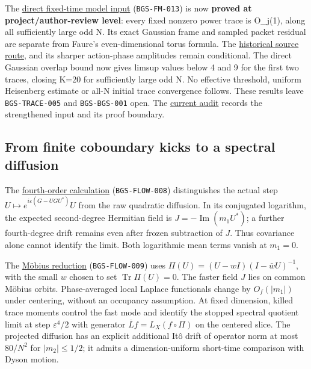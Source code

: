 The \href{https://github.com/ChurilovMaksim/BGS/blob/main/mathematics/fixed_time_wavepacket_trace_bound.md}{direct fixed-time model input}
(\texttt{BGS-FM-013}) is now \textbf{proved at project/author-review level}: every fixed
nonzero power trace is O\_j(1), along all sufficiently large odd N.
Its exact Gaussian frame and sampled packet residual are separate from
Faure's even-dimensional torus formula. The \href{https://github.com/ChurilovMaksim/BGS/blob/main/mathematics/quadratic_noise_fixed_time_input.md}{historical source route},
and its sharper action-phase amplitudes remain conditional. The direct
Gaussian overlap bound now gives limsup values below 4 and 9 for the first
two traces, closing K=20 for sufficiently large odd N.
No effective threshold, uniform Heisenberg estimate or all-N initial trace
convergence follows. These results leave \texttt{BGS-TRACE-005} and \texttt{BGS-BGS-001}
open. The \href{https://github.com/ChurilovMaksim/BGS/blob/main/archive/record/expansion_wavepacket_review_20261004.md}{current audit}
records the strengthened input and its proof boundary.

\hypertarget{from-finite-coboundary-kicks-to-a-spectral-diffusion}{%
\subsection{From finite coboundary kicks to a spectral diffusion}\label{from-finite-coboundary-kicks-to-a-spectral-diffusion}}

The \href{https://github.com/ChurilovMaksim/BGS/blob/main/mathematics/coboundary_fourth_order_drift.md}{fourth-order calculation}
(\texttt{BGS-FLOW-008}) distinguishes the actual step
\(U\mapsto e^{i\varepsilon(G-UGU^*)}U\) from the raw quadratic diffusion.
In its conjugated logarithm, the expected second-degree Hermitian field
is \(J=-\operatorname{Im}(m_1U^*)\); a further fourth-degree drift remains
even after frozen subtraction of \(J\). Thus covariance alone cannot
identify the limit. Both logarithmic mean terms vanish at \(m_1=0\).

The \href{https://github.com/ChurilovMaksim/BGS/blob/main/mathematics/coboundary_mobius_diffusion.md}{Möbius reduction}
(\texttt{BGS-FLOW-009}) uses
\(\Pi(U)=(U-wI)(I-\bar wU)^{-1}\), with the small \(w\) chosen to set
\(\operatorname{Tr}\Pi(U)=0\). The faster field \(J\) lies on common
Möbius orbits. Phase-averaged local Laplace functionals change by
\(O_f(|m_1|)\) under centering, without an occupancy assumption.
At fixed dimension, killed trace moments control the fast mode and
identify the stopped spectral quotient limit at step \(\varepsilon^4/2\)
with generator \(\overline Lf=L_X(f\circ\Pi)\) on the centered slice.
The projected diffusion has an explicit additional Itô drift of operator
norm at most \(80/N^2\) for \(|m_2|\le1/2\); it admits a dimension-uniform
short-time comparison with Dyson motion.


